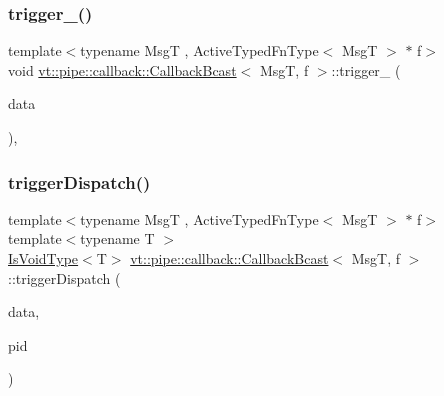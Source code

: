 \subsubsection{\texorpdfstring{trigger\+\_\+()}{trigger\_()}\hspace{0.1cm}{\footnotesize\ttfamily [3/3]}}
{\footnotesize\ttfamily template$<$typename MsgT , Active\+Typed\+Fn\+Type$<$ Msg\+T $>$ $\ast$ f$>$ \\
void \hyperlink{structvt_1_1pipe_1_1callback_1_1_callback_bcast}{vt\+::pipe\+::callback\+::\+Callback\+Bcast}$<$ MsgT, f $>$\+::trigger\+\_\+ (\begin{DoxyParamCaption}\item[{\hyperlink{structvt_1_1pipe_1_1callback_1_1_callback_bcast_aaf994b71056001334d30d74fa9c958f9}{Signal\+Data\+Type} $\ast$}]{data }\end{DoxyParamCaption})\hspace{0.3cm}{\ttfamily [override]}, {\ttfamily [private]}}

\mbox{\label{structvt_1_1pipe_1_1callback_1_1_callback_bcast_a8db0ff95fe319e739a93e87661365a5a}} 
\subsubsection{\texorpdfstring{trigger\+Dispatch()}{triggerDispatch()}\hspace{0.1cm}{\footnotesize\ttfamily [1/4]}}
{\footnotesize\ttfamily template$<$typename MsgT , Active\+Typed\+Fn\+Type$<$ Msg\+T $>$ $\ast$ f$>$ \\
template$<$typename T $>$ \\
\hyperlink{structvt_1_1pipe_1_1callback_1_1_callback_bcast_a3ca08c23824cfac76b837311a1d2c929}{Is\+Void\+Type}$<$T$>$ \hyperlink{structvt_1_1pipe_1_1callback_1_1_callback_bcast}{vt\+::pipe\+::callback\+::\+Callback\+Bcast}$<$ MsgT, f $>$\+::trigger\+Dispatch (\begin{DoxyParamCaption}\item[{\hyperlink{structvt_1_1pipe_1_1callback_1_1_callback_bcast_aaf994b71056001334d30d74fa9c958f9}{Signal\+Data\+Type} $\ast$}]{data,  }\item[{\hyperlink{namespacevt_ac9852acda74d1896f48f406cd72c7bd3}{Pipe\+Type} const \&}]{pid }\end{DoxyParamCaption})\hspace{0.3cm}{\ttfamily [private]}}

